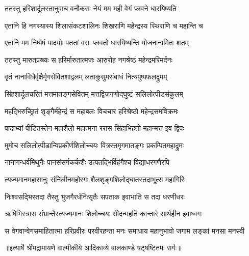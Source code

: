 \twolineshloka
{ततस्तु हरिशार्दूलस्तानुवाच वनौकसः}
{नेयं मम मही वेगं प्लवने धारयिष्यति} %

\twolineshloka
{एतानि हि नगस्यास्य शिलासंकटशालिनः}
{शिखराणि महेन्द्रस्य स्थिराणि च महान्ति च} %

\twolineshloka
{एतानि मम निष्पेषं पादयोः पततां वराः}
{प्लवतो धारयिष्यन्ति योजनानामितः शतम्} %

\twolineshloka
{ततस्तु मारुतप्रख्यः स हरिर्मारुतात्मजः}
{आरुरोह नगश्रेष्ठं महेन्द्रमरिमर्दनः} %

\twolineshloka
{वृतं नानाविधैर्वृक्षैर्मृगसेवितशाद्वलम्}
{लताकुसुमसंबाधं नित्यपुष्पफलद्रुमम्} %

\twolineshloka
{सिंहशार्दूलचरितं मत्तमातङ्गसेवितम्}
{मत्तद्विजगणोद्घुष्टं सलिलोत्पीडसंकुलम्} %

\twolineshloka
{महद्भिरुच्छ्रितं शृङ्गैर्महेन्द्रं स महाबलः}
{विचचार हरिश्रेष्ठो महेन्द्रसमविक्रमः} %

\twolineshloka
{पादाभ्यां पीडितस्तेन महाशैलो महात्मना}
{ररास सिंहाभिहतो महान्मत्त इव द्विपः} %

\twolineshloka
{मुमोच सलिलोत्पीडान्विप्रकीर्णशिलोच्चयः}
{वित्रस्तमृगमातङ्गः प्रकम्पितमहाद्रुमः} %

\twolineshloka
{नानागन्धर्वमिथुनैः पानसंसर्गकर्कशैः}
{उत्पतद्भिर्विहंगैश्च विद्याधरगणैरपि} %

\twolineshloka
{त्यज्यमानमहासानुः संनिलीनमहोरगः}
{शैलशृङ्गशिलोद्घातस्तदाभूत्स महागिरिः} %

\twolineshloka
{निःश्वसद्भिस्तदा तैस्तु भुजगैरर्धनिःसृतैः}
{सपताक इवाभाति स तदा धरणीधरः} %

\twolineshloka
{ऋषिभिस्त्रास संभ्रान्तैस्त्यज्यमानः शिलोच्चयः}
{सीदन्महति कान्तारे सार्थहीन इवाध्वगः} %

\fourlineindentedshloka
{स वेगवान्वेगसमाहितात्मा}
{ हरिप्रवीरः परवीरहन्ता}
{मनः समाधाय महानुभावो}
{ जगाम लङ्कां मनसा मनस्वी} %


{॥इत्यार्षे श्रीमद्रामायणे वाल्मीकीये आदिकाव्ये बालकाण्डे षट्षष्टितमः सर्गः॥}

